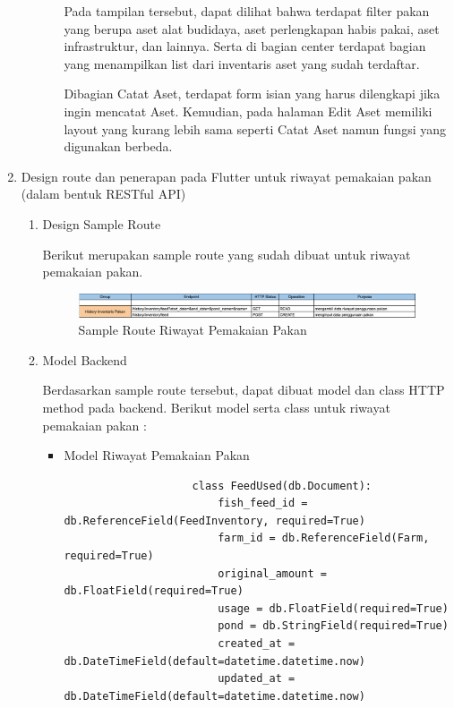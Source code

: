 \begin{spacing}{1.5}
\begin{enumerate}
\begin{enumerate}
\begin{itemize}
				Pada tampilan tersebut, dapat dilihat bahwa terdapat filter pakan yang berupa aset alat budidaya, aset perlengkapan habis pakai, aset infrastruktur, dan lainnya. Serta di bagian center terdapat bagian yang menampilkan list dari inventaris aset yang sudah terdaftar.

				Dibagian Catat Aset, terdapat form isian yang harus dilengkapi jika ingin mencatat Aset. Kemudian, pada halaman Edit Aset memiliki layout yang kurang lebih sama seperti Catat Aset namun fungsi yang digunakan berbeda.
		
			\end{itemize}
		\end{enumerate}
		
		\item Design route dan penerapan pada Flutter untuk riwayat pemakaian pakan (dalam bentuk RESTful API) 
		
		\begin{enumerate}
			\item Design Sample Route
			
			Berikut merupakan sample route yang sudah dibuat untuk riwayat pemakaian pakan.

			\begin{figure}[H]
				\centering
				\includegraphics[width=1.1\textwidth]{gambar/sprint4/pakan_hs_route.png}
				\caption{Sample Route Riwayat Pemakaian Pakan}
			\end{figure}

			\item Model Backend
 			
			Berdasarkan sample route tersebut, dapat dibuat model dan class HTTP method pada backend. Berikut model serta class untuk riwayat pemakaian pakan :

			\begin{itemize}
				\item Model Riwayat Pemakaian Pakan
				
				\begin{lstlisting}
					class FeedUsed(db.Document):
						fish_feed_id = db.ReferenceField(FeedInventory, required=True)
						farm_id = db.ReferenceField(Farm, required=True)
						original_amount = db.FloatField(required=True)
						usage = db.FloatField(required=True)
						pond = db.StringField(required=True)
						created_at = db.DateTimeField(default=datetime.datetime.now)
						updated_at = db.DateTimeField(default=datetime.datetime.now)
				\end{lstlisting}


\end{itemize}
\end{enumerate}
\end{enumerate}
\end{spacing}
